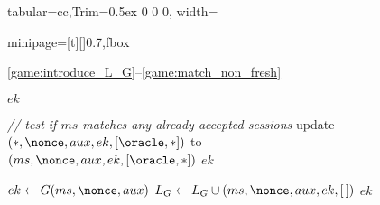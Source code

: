 
\renewcommand*{\codewidth}{0.7\linewidth}

\begin{figure}

\begin{fullpage}

\small

\setlength{\tabcolsep}{0.5pt}
\renewcommand{\arraystretch}{2}

\begin{adjustbox}{tabular={cc},Trim=0.5ex 0 0 0, width=\textwidth}
	\begin{adjustbox}{minipage=[t][]{\codewidth},fbox}
		\begin{algorithmic}[1]	
			\Statex 
			\Comment \cref{game:introduce_L_G}--\cref{game:match_non_fresh}
		
			\State {}
			
		    	\State \Return $ek$
		    	
		    \color{hidecode}
		    
		    \State \textcolor{hidecode}{\emph{// test if $ms$ matches any already accepted sessions}}	
				\State update $(*, \nonce, aux, ek, [\oracle,*])$ to $(ms, \nonce, aux, ek, [\oracle,*])$
				\State \Return $ek$
		
			\color{black}
			
			\Else\label{alg:line:G-code:else:clause}
				\State {}
				\State $ek \gets G(ms, \nonce, aux)$
				\State $L_G \gets L_G \cup  (ms, \nonce, aux, ek, [\,]) $
				\State \Return $ek$
			\EndIf
			
		\end{algorithmic}
	\end{adjustbox}
	
	\hspace*{-6.15pt}
	

\end{adjustbox}
\end{fullpage}
\end{figure}

